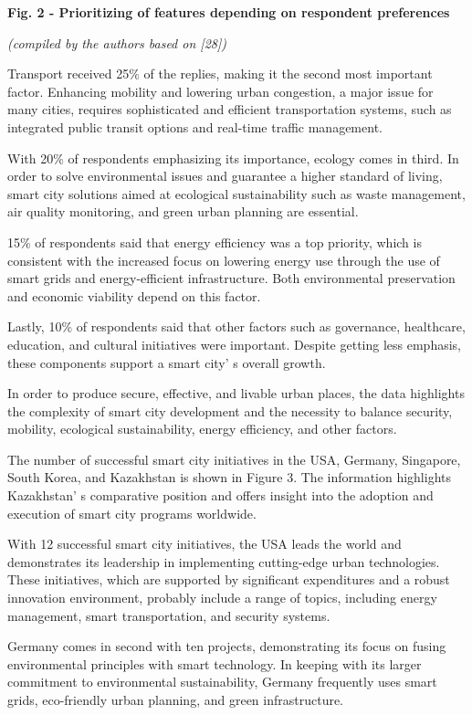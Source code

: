 {\bfseries Fig. 2 - Prioritizing of features depending on respondent preferences}

\emph{(compiled by the authors based on {[}28{]})}

\begin{multicols}{2}
Transport received 25\% of the replies, making it the second most
important factor. Enhancing mobility and lowering urban congestion, a
major issue for many cities, requires sophisticated and efficient
transportation systems, such as integrated public transit options and
real-time traffic management.

With 20\% of respondents emphasizing its importance, ecology comes in
third. In order to solve environmental issues and guarantee a higher
standard of living, smart city solutions aimed at ecological
sustainability such as waste management, air quality monitoring, and
green urban planning are essential.

15\% of respondents said that energy efficiency was a top priority,
which is consistent with the increased focus on lowering energy use
through the use of smart grids and energy-efficient infrastructure. Both
environmental preservation and economic viability depend on this factor.

Lastly, 10\% of respondents said that other factors such as governance,
healthcare, education, and cultural initiatives were important. Despite
getting less emphasis, these components support a smart
city' s overall growth.

In order to produce secure, effective, and livable urban places, the
data highlights the complexity of smart city development and the
necessity to balance security, mobility, ecological sustainability,
energy efficiency, and other factors.

The number of successful smart city initiatives in the USA, Germany,
Singapore, South Korea, and Kazakhstan is shown in Figure 3. The
information highlights Kazakhstan' s comparative position
and offers insight into the adoption and execution of smart city
programs worldwide.

With 12 successful smart city initiatives, the USA leads the world and
demonstrates its leadership in implementing cutting-edge urban
technologies. These initiatives, which are supported by significant
expenditures and a robust innovation environment, probably include a
range of topics, including energy management, smart transportation, and
security systems.

Germany comes in second with ten projects, demonstrating its focus on
fusing environmental principles with smart technology. In keeping with
its larger commitment to environmental sustainability, Germany
frequently uses smart grids, eco-friendly urban planning, and green
infrastructure.
\end{multicols}

